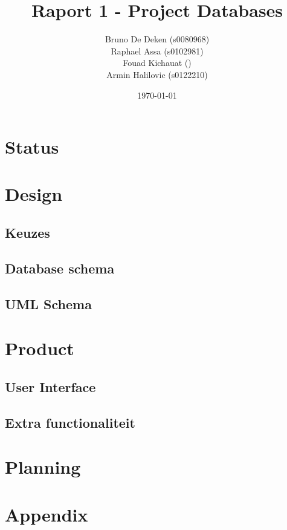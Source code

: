 \documentclass[12pt]{article}
\title{Raport 1 - Project Databases}
\author{
    Bruno De Deken (s0080968) \\
    Raphael Assa (s0102981) \\
    Fouad Kichauat () \\
    Armin Halilovic (s0122210)
}
\date{\today}
\begin{document}
\maketitle

\section{Status}

\section{Design}
\subsection{Keuzes}

\subsection{Database schema}

\subsection{UML Schema}


\section{Product}
\subsection{User Interface}

\subsection{Extra functionaliteit}


\section{Planning}

\section{Appendix}

\end{document}

